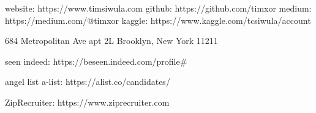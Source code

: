 %

website: https://www.timsiwula.com
github: https://github.com/timxor
medium: https://medium.com/@timxor
kaggle: https://www.kaggle.com/tcsiwula/account






684 Metropolitan Ave
apt 2L
Brooklyn, New York 11211



seen indeed: https://beseen.indeed.com/profile#

angel list a-list: https://alist.co/candidates/

ZipRecruiter: https://www.ziprecruiter.com

